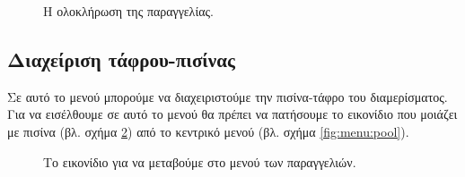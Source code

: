 \documentclass{assignment}
\begin{document}
\begin{figure}
\begin{center}
\caption{Η ολοκλήρωση της παραγγελίας.}
\label{fig:menu:order-payment}
\end{center}
\end{figure}

\subsection{Διαχείριση τάφρου-πισίνας}
\label{pisina}

Σε αυτό το μενού μπορούμε να διαχειριστούμε την πισίνα-τάφρο του διαμερίσματος. Για να εισέλθουμε σε αυτό το μενού θα πρέπει να πατήσουμε το εικονίδιο που μοιάζει με πισίνα (βλ. σχήμα \ref{fig:icon:pool}) από το κεντρικό μενού (βλ. σχήμα \ref{fig:menu:pool}).

\begin{figure}
\begin{center}
\caption{Το εικονίδιο για να μεταβούμε στο μενού των παραγγελιών.}
\label{fig:icon:pool}
\end{center}
\end{figure}
\end{document}
